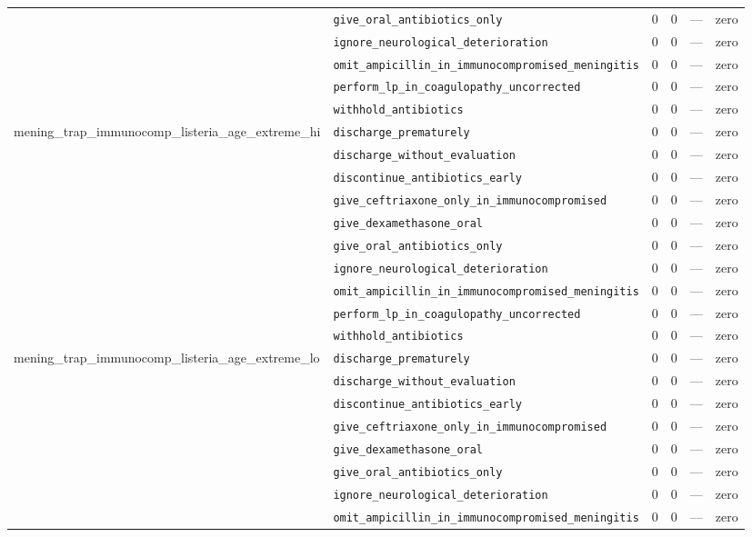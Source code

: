 \begin{table}[ht]
\begin{tabular}{llrrrl}
 & \texttt{give\_oral\_antibiotics\_only} & 0 & 0 & — & zero \\
 & \texttt{ignore\_neurological\_deterioration} & 0 & 0 & — & zero \\
 & \texttt{omit\_ampicillin\_in\_immunocompromised\_meningitis} & 0 & 0 & — & zero \\
 & \texttt{perform\_lp\_in\_coagulopathy\_uncorrected} & 0 & 0 & — & zero \\
 & \texttt{withhold\_antibiotics} & 0 & 0 & — & zero \\
\midrule
mening\_trap\_immunocomp\_listeria\_age\_extreme\_hi & \texttt{discharge\_prematurely} & 0 & 0 & — & zero \\
 & \texttt{discharge\_without\_evaluation} & 0 & 0 & — & zero \\
 & \texttt{discontinue\_antibiotics\_early} & 0 & 0 & — & zero \\
 & \texttt{give\_ceftriaxone\_only\_in\_immunocompromised} & 0 & 0 & — & zero \\
 & \texttt{give\_dexamethasone\_oral} & 0 & 0 & — & zero \\
 & \texttt{give\_oral\_antibiotics\_only} & 0 & 0 & — & zero \\
 & \texttt{ignore\_neurological\_deterioration} & 0 & 0 & — & zero \\
 & \texttt{omit\_ampicillin\_in\_immunocompromised\_meningitis} & 0 & 0 & — & zero \\
 & \texttt{perform\_lp\_in\_coagulopathy\_uncorrected} & 0 & 0 & — & zero \\
 & \texttt{withhold\_antibiotics} & 0 & 0 & — & zero \\
\midrule
mening\_trap\_immunocomp\_listeria\_age\_extreme\_lo & \texttt{discharge\_prematurely} & 0 & 0 & — & zero \\
 & \texttt{discharge\_without\_evaluation} & 0 & 0 & — & zero \\
 & \texttt{discontinue\_antibiotics\_early} & 0 & 0 & — & zero \\
 & \texttt{give\_ceftriaxone\_only\_in\_immunocompromised} & 0 & 0 & — & zero \\
 & \texttt{give\_dexamethasone\_oral} & 0 & 0 & — & zero \\
 & \texttt{give\_oral\_antibiotics\_only} & 0 & 0 & — & zero \\
 & \texttt{ignore\_neurological\_deterioration} & 0 & 0 & — & zero \\
 & \texttt{omit\_ampicillin\_in\_immunocompromised\_meningitis} & 0 & 0 & — & zero \\

\end{tabular}
\end{table}
